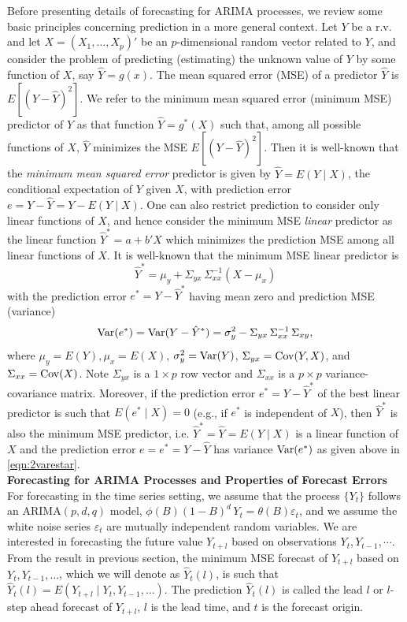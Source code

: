 Before presenting details of forecasting for ARIMA processes, we review some basic principles concerning prediction in a more general context. Let $Y$ be a r.v. and let $X = (X_1, \ldots, X_p)'$ be an $p$-dimensional random vector related to $Y$, and consider the problem of predicting (estimating) the unknown value of $Y$ by some function of $X$, say $\hat{Y} = g(x)$. The mean squared error (MSE) of a predictor $\hat{Y}$ is $E[(Y - \hat{Y})^2]$. We refer to the minimum mean squared error (minimum MSE) predictor of $Y$ as that function $\hat{Y} = g^*(X)$ such that, among all possible functions of $X$, $\hat{Y}$ minimizes the MSE $E[(Y - \hat{Y})^2]$. Then it is well-known that the \emph{minimum mean squared error} predictor is given by $\hat{Y} = E(Y\;|\;X)$, the conditional expectation of $Y$ given $X$, with prediction error $e = Y - \hat{Y} = Y - E(Y\;|\;X)$. One can also restrict prediction to consider only linear functions of $X$, and hence consider the minimum MSE \emph{linear} predictor as the linear function $\hat{Y}^* = a + b' X$ which minimizes the prediction MSE among all linear functions of $X$. It is well-known that the minimum MSE linear predictor is
	\begin{equation} \label{eqn:2yhatstar}
	\hat{Y}^* = \mu_y + \Sigma_{yx}\,\Sigma_{xx}^{-1}(X - \mu_x)
	\end{equation}
with the prediction error $e^* = Y - \hat{Y}^*$ having mean zero and prediction MSE (variance)
	\begin{equation} \label{eqn:2varestar}
	\var(e^*) = \var(Y - \hat{Y}^*) = \sigma_y^2 - \Sigma_{yx}\,\Sigma_{xx}^{-1}\,\Sigma_{xy},
	\end{equation}
where $\mu_y = E(Y), \mu_x = E(X)$, $\sigma_y^2 = \operatorname{Var}(Y)$, $\Sigma_{yx} = \operatorname{Cov}(Y,X)$, and $\Sigma_{xx} = \operatorname{Cov}(X)$. Note $\Sigma_{yx}$ is a $1 \times p$ row vector and $\Sigma_{xx}$ is a $p \times p$ variance-covariance matrix. Moreover, if the prediction error $e^* = Y - \hat{Y}^*$ of the best linear predictor is such that $E(e^*\;|\;X) = 0$ (e.g., if $e^*$ is independent of $X$), then $\hat{Y}^*$ is also the minimum MSE predictor, i.e. $\hat{Y}^* = \hat{Y} = E(Y\;|\;X)$ is a linear function of $X$ and the prediction error $e = e^* = Y - \hat{Y}$ has variance $\operatorname{Var}(e^*)$ as given above in \eqref{eqn:2varestar}. \\


\noindent\textbf{Forecasting for ARIMA Processes and Properties of Forecast Errors} \\


For forecasting in the time series setting, we assume that the process $\{ Y_t \}$ follows an ARIMA$(p,d,q)$ model, $\phi(B)(1 - B)^d\,  Y_t = \theta(B) \varepsilon_t$, and we assume the white noise series $\varepsilon_t$ are mutually independent random variables. We are interested in forecasting the future value $Y_{t+l}$ based on observations $Y_t,Y_{t-1},\cdots$. From the result in previous section, the minimum MSE forecast of $Y_{t+l}$ based on $Y_t, Y_{t-1}, \ldots$, which we will denote as $\hat{Y}_t(l)$, is such that $\hat{Y}_t(l) = E(Y_{t+l} \;|\; Y_t,Y_{t-1},\ldots)$. The prediction $\hat{Y}_t(l)$ is called the lead $l$ or $l$-step ahead forecast of $Y_{t+l}$, $l$ is the lead time, and $t$ is the forecast origin.


